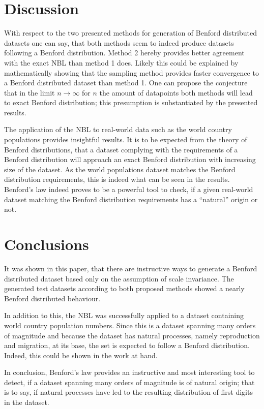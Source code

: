 \documentclass[a4paper,11pt, twocolumn]{article}
\begin{document}
\section{Discussion}
With respect to the two presented methods for generation of Benford distributed datasets one can say, that both methods seem to indeed produce datasets following a Benford distribution. Method 2 hereby provides better agreement with the exact NBL than method 1 does. Likely this could be explained by mathematically showing that the sampling method provides faster convergence to a Benford distributed dataset than method 1. One can propose the conjecture that in the limit $n \rightarrow \infty$ for $n$ the amount of datapoints both methods will lead to exact Benford distribution; this presumption is substantiated by the presented results.

The application of the NBL to real-world data such as the world country populations provides insightful results. It is to be expected from the theory of Benford distributions, that a dataset complying with the requirements of a Benford distribution will approach an exact Benford distribution with increasing size of the dataset. As the world populations dataset matches the Benford distribution requirements, this is indeed what can be seen in the results. Benford's law indeed proves to be a powerful tool to check, if a given real-world dataset matching the Benford distribution requirements has a ``natural'' origin or not.

\section{Conclusions}
It was shown in this paper, that there are instructive ways to generate a Benford distributed dataset based only on the assumption of scale invariance. The generated test datasets according to both proposed methods showed a nearly Benford distributed behaviour.

In addition to this, the NBL was successfully applied to a dataset containing world country population numbers. Since this is a dataset spanning many orders of magnitude and because the dataset has natural processes, namely reproduction and migration, at its base, the set is expected to follow a Benford distribution. Indeed, this could be shown in the work at hand.

In conclusion, Benford's law provides an instructive and most interesting tool to detect, if a dataset spanning many orders of magnitude is of natural origin; that is to say, if natural processes have led to the resulting distribution of first digits in the dataset.

\appendix





\end{document}
